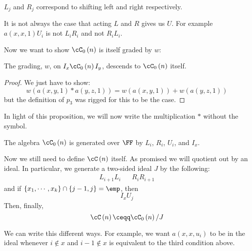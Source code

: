 \documentclass{amsproc}
\begin{document}
\begin{rmk}
$L_j$ and $R_j$ correspond to shifting left and right respectively.
\end{rmk}

\begin{wrn}
It is not always the case that acting $L$ and $R$ gives us $U$.
For example $a\left( x , x , 1 \right) U_i$ is not $L_i R_i$ and not
$R_i L_i$.
\end{wrn}

Now we want to show $\cC_0\left( n \right)$ is itself graded by $w$:

\begin{prop}
The grading, $w$, on $I_x \cC_0\left( n \right) I_y$, 
descends to $\cC_0\left( n \right)$ itself.
\end{prop}

\begin{proof}
We just have to show:
\begin{equation}
w\left( a\left( x , y , 1 \right) * a\left( y , z , 1 \right) \right) = 
w\left( a\left( x , y , 1 \right)  \right) + 
w\left( a\left( y , z , 1 \right) \right)
\end{equation}
but the definition of $p_3$ was rigged for this to be the case.
\end{proof}

In light of this proposition, we will now write the multiplication $*$
without the symbol.

\begin{prop}
The algebra $\cC_0\left( n \right)$ is generated over $\FF$ by $L_i$, $R_i$, $U_i$, 
and $I_x$.
\end{prop}

Now we still need to define $\cC\left( n \right)$ itself.
As promised we will quotient out by an ideal.
In particular, we generate a two-sided ideal $J$ by the following:
\begin{align}
L_{i+1} L_i &&
R_i R_{i+1} 
\end{align}
and if $\left\{ x_1 , \cdots , x_k \right\} \cap \left\{ j-1 , j \right\} = \emp$, 
then
\begin{equation}
I_x U_j
\end{equation}
Then, finally, 
\begin{equation}
\cC\left( n \right) \ceqq 
\cC_0\left( n \right) / J
\end{equation}

We can write this different ways. 
For example, we want $a\left( x , x, u_i \right)$ to be in the ideal whenever $i \not \in x$ 
and $i -1 \not \in x$ is equivalent to the third condition above.
\end{document}
